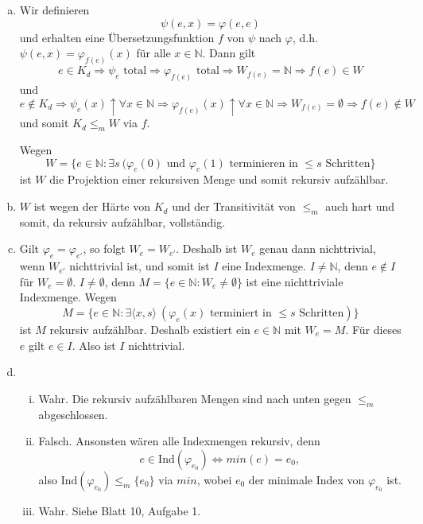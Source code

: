 \documentclass[german,headsepline]{scrartcl}
\begin{document}
	\begin{solution}
		\begin{enumerate}[(a)]
			\item Wir definieren
				\[\psi(e,x)=\varphi(e,e)\]
				und erhalten eine Übersetzungsfunktion $f$ von $\psi$ nach $\varphi$,
				d.h. $\psi(e,x)=\varphi_{f(e)}(x)$ für alle $x\in\mathbb{N}$.
				Dann gilt
				\[e\in K_d\Rightarrow\psi_e\text{ total}\Rightarrow\varphi_{f(e)}\text{ total}
				\Rightarrow W_{f(e)}=\mathbb{N}\Rightarrow f(e)\in W\]
				und
				\[e\notin K_d\Rightarrow\psi_e(x)\uparrow\forall x\in\mathbb{N}
				\Rightarrow\varphi_{f(e)}(x)\uparrow\forall x\in\mathbb{N}
				\Rightarrow W_{f(e)}=\emptyset\Rightarrow f(e)\notin W\]
				und somit $K_d\leq_mW$ via $f$.
				
				Wegen
				\[W=\{e\in\mathbb{N}\colon\exists s~(\varphi_e(0)\text{ und }\varphi_e(1)\text{ terminieren in $\leq s$ Schritten}\}\]
				ist $W$ die Projektion einer rekursiven Menge und somit rekursiv aufzählbar.
			\item $W$ ist wegen der Härte von $K_d$ und der Transitivität von $\leq_m$ auch hart und somit, da rekursiv aufzählbar, vollständig.
			\item Gilt $\varphi_e=\varphi_{e'}$, so folgt $W_e=W_{e'}$.
				Deshalb ist $W_e$ genau dann nichttrivial, wenn $W_{e'}$ nichttrivial ist, und somit ist $I$ eine Indexmenge.
				$I\neq\mathbb{N}$, denn $e\notin I$ für $W_e=\emptyset$.
				$I\neq\emptyset$, denn $M=\{e\in\mathbb{N}\colon W_e\neq\emptyset\}$ ist eine nichttriviale Indexmenge. Wegen
				\[M=\{e\in\mathbb{N}\colon\exists\langle x,s\rangle~(\varphi_e(x)\text{ terminiert in }\leq s\text{ Schritten})\}\]
				ist $M$ rekursiv aufzählbar.
				Deshalb existiert ein $e\in\mathbb{N}$ mit $W_e=M$. Für dieses $e$ gilt $e\in I$.
				Also ist $I$ nichttrivial.
			\item \begin{enumerate}[(i)]
					\item Wahr. Die rekursiv aufzählbaren Mengen sind nach unten gegen $\leq_m$ abgeschlossen.
					\item Falsch. Ansonsten wären alle Indexmengen rekursiv, denn
						\[e\in\text{Ind}(\varphi_{e_0})\Leftrightarrow min(e)=e_0,\]
						also $\text{Ind}(\varphi_{e_0})\leq_m\{e_0\}$ via $min$,
						wobei $e_0$ der minimale Index von $\varphi_{e_0}$ ist.
					\item Wahr. Siehe Blatt 10, Aufgabe 1.
				\end{enumerate}
				
		\end{enumerate}
	\end{solution}
	
\end{document}
